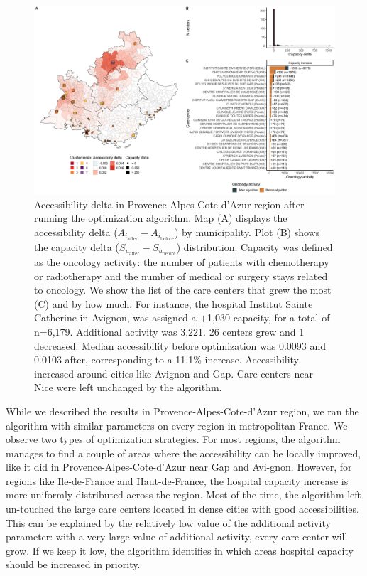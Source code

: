 \begin{figure}[h]
    \includegraphics[width=\textwidth]{images/camion/fig5_Provence-Alpes-Cote-d'Azur.png}
    \centering
    \caption{
        Accessibility delta in Provence-Alpes-Cote-d'Azur region after running the optimization algorithm. Map (A) displays the accessibility delta ($A_{i_\text{after}} - A_{i_\text{before}}$) by municipality. Plot (B) shows the capacity delta ($S_{u_\text{after}}-S_{u_\text{before}}$) distribution. Capacity was defined as the oncology activity: the number of patients with chemotherapy or radiotherapy and the number of medical or surgery stays related to oncology. We show the list of the care centers that grew the most (C)  and by how much. For instance, the hospital Institut Sainte Catherine in Avignon, was assigned a +1,030 capacity, for a total of n=6,179. Additional activity was 3,221. 26 centers grew and 1 decreased. Median accessibility before optimization was 0.0093 and 0.0103 after, corresponding to a 11.1\% increase.  Accessibility increased around cities like Avignon and Gap. Care centers near Nice were left unchanged by the algorithm.
    }
    \label{fig:optim-paca}
\end{figure}

While we described the results in Provence-Alpes-Cote-d'Azur region, we ran the algorithm with similar parameters on every region in metropolitan France. We observe two types of optimization strategies. For most regions, the algorithm manages to find a couple of areas where the accessibility can be locally improved, like it did in Provence-Alpes-Cote-d'Azur near Gap and Avi-gnon. However, for regions like Ile-de-France and Haut-de-France, the hospital capacity increase is more uniformly distributed across the region. Most of the time, the algorithm left un-touched the large care centers located in dense cities with good accessibilities. This can be explained by the relatively low value of the additional activity parameter: with a very large value of additional activity, every care center will grow. If we keep it low, the algorithm identifies in which areas hospital capacity should be increased in priority.

